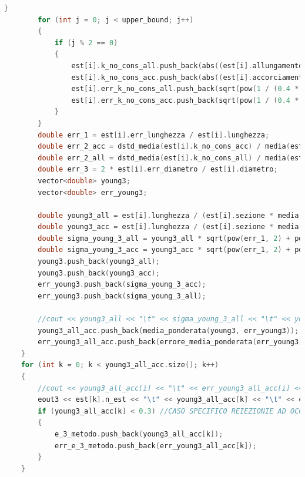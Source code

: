 \documentclass[a4paper,11pt,oneside]{article}
\begin{document}
\begin{lstlisting}[language=C++, label=lst:seconda_parte, caption=seconda\_parte]
		}
		for (int j = 0; j < upper_bound; j++)
		{
			if (j % 2 == 0)
			{
				est[i].k_no_cons_all.push_back(abs((est[i].allungamento[j + 1] - est[i].allungamento[j])) / (0.4 * 9.806));
				est[i].k_no_cons_acc.push_back(abs((est[i].accorciamento[j + 1] - est[i].accorciamento[j])) / (0.4 * 9.806));
				est[i].err_k_no_cons_all.push_back(sqrt(pow(1 / (0.4 * 9.806), 2) * pow(est[i].err_delta_x_all[j], 2) + pow((-(est[i].allungamento[j + 1] - est[i].allungamento[j]) / pow((0.4 * 9.806), 2)), 2) * pow(sigma_delta_f, 2)));
				est[i].err_k_no_cons_acc.push_back(sqrt(pow(1 / (0.4 * 9.806), 2) * pow(est[i].err_delta_x_acc[j], 2) + pow((-(est[i].accorciamento[j + 1] - est[i].accorciamento[j]) / pow((0.4 * 9.806), 2)), 2) * pow(sigma_delta_f, 2))); //propag. deltaf
			}
		}
		double err_1 = est[i].err_lunghezza / est[i].lunghezza;
		double err_2_acc = dstd_media(est[i].k_no_cons_acc) / media(est[i].k_no_cons_acc);
		double err_2_all = dstd_media(est[i].k_no_cons_all) / media(est[i].k_no_cons_all);
		double err_3 = 2 * est[i].err_diametro / est[i].diametro;
		vector<double> young3;
		vector<double> err_young3;

		double young3_all = est[i].lunghezza / (est[i].sezione * media(est[i].k_no_cons_all));
		double young3_acc = est[i].lunghezza / (est[i].sezione * media(est[i].k_no_cons_acc));
		double sigma_young_3_all = young3_all * sqrt(pow(err_1, 2) + pow(err_2_all, 2) + pow(err_3, 2));
		double sigma_young_3_acc = young3_acc * sqrt(pow(err_1, 2) + pow(err_2_acc, 2) + pow(err_3, 2));
		young3.push_back(young3_all);
		young3.push_back(young3_acc);
		err_young3.push_back(sigma_young_3_acc);
		err_young3.push_back(sigma_young_3_all);

		//cout << young3_all << "\t" << sigma_young_3_all << "\t" << young3_acc << "\t" << sigma_young_3_acc << endl; //Stampa modulo young in all e acc
		young3_all_acc.push_back(media_ponderata(young3, err_young3));
		err_young3_all_acc.push_back(errore_media_ponderata(err_young3));
	}
	for (int k = 0; k < young3_all_acc.size(); k++)
	{
		//cout << young3_all_acc[i] << "\t" << err_young3_all_acc[i] << endl;
		eout3 << est[k].n_est << "\t" << young3_all_acc[k] << "\t" << err_young3_all_acc[k] << endl;
		if (young3_all_acc[k] < 0.3) //CASO SPECIFICO REIEZIONIE AD OCCHIO
		{
			e_3_metodo.push_back(young3_all_acc[k]);
			err_e_3_metodo.push_back(err_young3_all_acc[k]);
		}
	}


\end{lstlisting}
\end{document}
